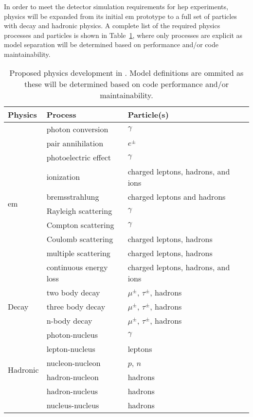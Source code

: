 In order to meet the detector simulation requirements for \acs{hep} experiments,
\celeritas physics will be expanded from its initial \ac{em} prototype to a full
set of particles with decay and hadronic physics.  A complete list of the
required physics processes and particles is shown in
Table~\ref{tab:proposed-physics}, where only processes are explicit as model
separation will be determined based on performance and/or code maintainability.
\begin{table}
  \caption{Proposed physics development in \celeritas. Model definitions are
  ommited as these will be determined based on code performance and/or
  maintainability.}
  \label{tab:proposed-physics}
  \centering
  \begin{tabular}{llll}
    \toprule
    Physics & Process & Particle(s)\\
    \midrule
    \multirow{10}{*}{\acs{em}} & photon conversion & $\gamma$\\
    & pair annihilation & $e^\pm$\\
    & photoelectric effect& $\gamma$\\
    & ionization & charged leptons, hadrons, and ions\\
    & bremsstrahlung & charged leptons and hadrons\\
    & Rayleigh scattering & $\gamma$\\
    & Compton scattering & $\gamma$\\
    & Coulomb scattering & charged leptons, hadrons\\
    & multiple scattering & charged leptons, hadrons\\
    & continuous energy loss & charged leptons, hadrons, and ions\\
    \midrule
    \multirow{3}{*}{Decay}
    & two body decay & $\mu^\pm$, $\tau^\pm$, hadrons\\
    & three body decay & $\mu^\pm$, $\tau^\pm$, hadrons\\
    & n-body decay & $\mu^\pm$, $\tau^\pm$, hadrons\\
    \midrule
    \multirow{6}{*}{Hadronic}
    & photon-nucleus & $\gamma$ \\
    & lepton-nucleus & leptons \\
    & nucleon-nucleon & $p$, $n$\\
    & hadron-nucleon & hadrons\\
    & hadron-nucleus & hadrons\\
    & nucleus-nucleus & hadrons\\
    \bottomrule
  \end{tabular}
\end{table}

